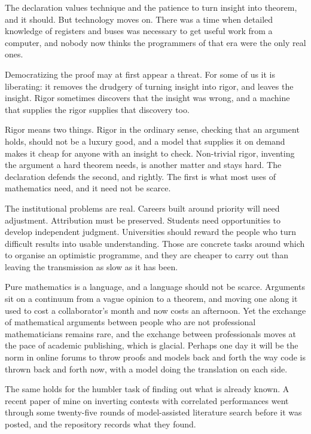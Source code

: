 \documentclass[11pt]{article}
\theoremstyle{definition}
\theoremstyle{remark}
\begin{document}
The declaration values technique and the patience to turn insight into theorem, and it should. But technology moves on. There was a time when detailed knowledge of registers and buses was necessary to get useful work from a computer, and nobody now thinks the programmers of that era were the only real ones.

Democratizing the proof may at first appear a threat. For some of us it is liberating: it removes the drudgery of turning insight into rigor, and leaves the insight. Rigor sometimes discovers that the insight was wrong, and a machine that supplies the rigor supplies that discovery too.

Rigor means two things. Rigor in the ordinary sense, checking that an argument holds, should not be a luxury good, and a model that supplies it on demand makes it cheap for anyone with an insight to check. Non-trivial rigor, inventing the argument a hard theorem needs, is another matter and stays hard. The declaration defends the second, and rightly. The first is what most uses of mathematics need, and it need not be scarce.

The institutional problems are real. Careers built around priority will need adjustment. Attribution must be preserved. Students need opportunities to develop independent judgment. Universities should reward the people who turn difficult results into usable understanding. Those are concrete tasks around which to organise an optimistic programme, and they are cheaper to carry out than leaving the transmission as slow as it has been.

Pure mathematics is a language, and a language should not be scarce. Arguments sit on a continuum from a vague opinion to a theorem, and moving one along it used to cost a collaborator's month and now costs an afternoon. Yet the exchange of mathematical arguments between people who are not professional mathematicians remains rare, and the exchange between professionals moves at the pace of academic publishing, which is glacial. Perhaps one day it will be the norm in online forums to throw proofs and models back and forth the way code is thrown back and forth now, with a model doing the translation on each side.

The same holds for the humbler task of finding out what is already known. A recent paper of mine on inverting contests with correlated performances \citep{cotton2026contests} went through some twenty-five rounds of model-assisted literature search before it was posted, and the repository records what they found.
\end{document}
